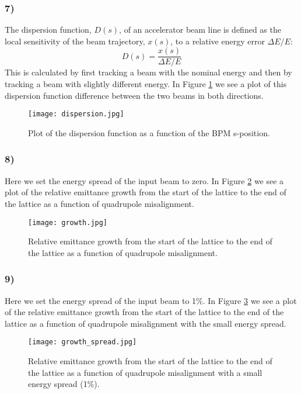 \documentclass[12pt,a4paper,english]{article}
\begin{document}
\subsubsection*{7)}
The dispersion function, $D(s)$, of an accelerator beam line is defined as the local sensitivity of the beam trajectory, $x(s)$, to a relative energy error $\Delta E/E$:
\begin{equation}
D(s)=\frac{x(s)}{\Delta E/E}
\end{equation}
This is calculated by first tracking a beam with the nominal energy and then by tracking a beam with slightly different energy. In Figure \ref{fig:dispersion} we see a plot of this dispersion function difference between the two beams in both directions.

\begin{figure}[htbp!]
	\centering\texttt{[image: dispersion.jpg]}
	\caption{Plot of the dispersion function as a function of the BPM s-position. \label{fig:dispersion}}
\end{figure} 

\subsubsection*{8)}
Here we set the energy spread of the input beam to zero. In Figure \ref{fig:em_growth} we see a plot of the relative emittance growth from the start of the lattice to the end of the lattice as a function of quadrupole misalignment.

\begin{figure}[htbp!]
	\centering\texttt{[image: growth.jpg]}
	\caption{Relative emittance growth from the start of the lattice to the end of the lattice as a function of quadrupole misalignment. \label{fig:em_growth}}
\end{figure} 
\newpage
\subsubsection*{9)}
Here we set the energy spread of the input beam to 1\%. In Figure \ref{fig:em_growth_spread} we see a plot of the relative emittance growth from the start of the lattice to the end of the lattice as a function of quadrupole misalignment with the small energy spread.

\begin{figure}[htbp!]
	\centering\texttt{[image: growth\_spread.jpg]}
	\caption{Relative emittance growth from the start of the lattice to the end of the lattice as a function of quadrupole misalignment with a small energy spread (1\%). \label{fig:em_growth_spread}}
\end{figure} 
\end{document}
